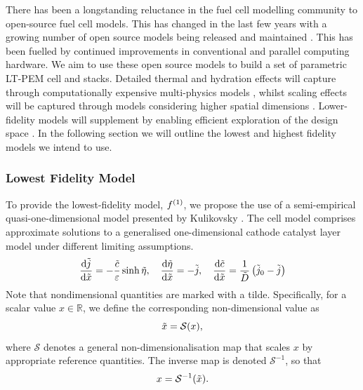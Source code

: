 There has been a longstanding reluctance in the fuel cell modelling community to open-source fuel cell models.
This has changed in the last few years with a growing number of open source models being released and maintained \cite{vetterFreeOpenReference2019, secanellOpenFCSTOpenSourceMathematical2014, zhangOpenFuelCell2NewComputational2024,  koneOpenSourceToolboxPEM2018, gassAlphaPEMOpensourceDynamic2025}.
This has been fuelled by continued improvements in conventional and parallel computing hardware.
We aim to use these open source models to build a set of parametric LT-PEM cell and stacks.
Detailed thermal and hydration effects will capture through computationally expensive multi-physics models \cite{secanellOpenFCSTOpenSourceMathematical2014, zhangOpenFuelCell2NewComputational2024, vetterFreeOpenReference2019}, whilst scaling effects will be captured through models considering higher spatial dimensions \cite{secanellOpenFCSTOpenSourceMathematical2014, zhangOpenFuelCell2NewComputational2024, koneOpenSourceToolboxPEM2018}.
Lower-fidelity models will supplement by enabling efficient exploration of the design space \cite{kulikovskyPhysicallyBasedAnalytical2013a, ohayreFuelCellFundamentals2016, larminieFuelCellSystems2003}. In the following section we will outline the lowest and highest fidelity models we intend to use.

\subsubsection{Lowest Fidelity Model}

To provide the lowest-fidelity model, $f^{(1)}$, we propose the use of a semi-empirical quasi-one-dimensional model presented by Kulikovsky \cite{kulikovskyPhysicallyBasedAnalytical2013a}.
The cell model comprises approximate solutions to a generalised one-dimensional cathode catalyst layer model under different limiting assumptions.
\begin{equation}
	\frac{\text{d} \tilde{j}}{\text{d} \tilde{x}}      = -\frac{\tilde{c}}{\varepsilon}\sinh{\tilde{\eta}}, \quad
	\frac{\text{d} \tilde{\eta}}{\text{d} \tilde{x}}  = -\tilde{j}, \quad
	\frac{\text{d} \tilde{c}}{\text{d} \tilde{x}}      = \frac{1}{\tilde{D}}\left(\tilde{j}_0 - \tilde{j}\right)
\end{equation}
Note that nondimensional quantities are marked with a tilde. Specifically, for a scalar value \( x \in \mathbb{R} \), we define the corresponding non-dimensional value as
\[
	\tilde{x} = \mathcal{S}(x),
\]
where \( \mathcal{S} \) denotes a general non-dimensionalisation map that scales \( x \) by appropriate reference quantities. The inverse map is denoted \( \mathcal{S}^{-1} \), so that
\[
	x = \mathcal{S}^{-1}(\tilde{x}).
\]

